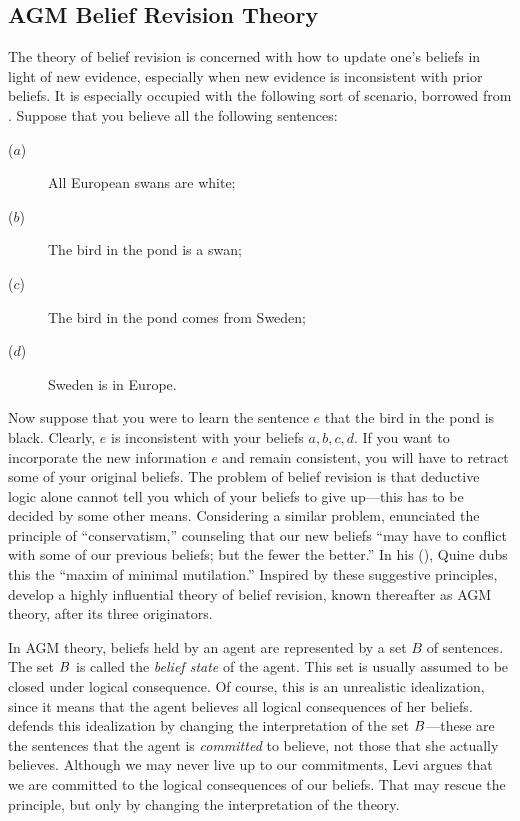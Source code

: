 \subsection{AGM Belief Revision Theory}
The theory of belief revision is concerned with how to update one's beliefs in
light of new evidence, especially when new evidence is inconsistent with prior
beliefs. It is especially occupied with the following sort of scenario, borrowed
from \citet{gardenfors1992beliefrevision}. Suppose that you believe all the
following sentences:
\begin{description}
\item[($a$)] All European swans are white;
\item[($b$)] The bird in the pond is a swan;
\item[($c$)] The bird in the pond comes from Sweden;
\item[($d$)] Sweden is in Europe. 
\end{description}
Now suppose that you were to learn the sentence $e$ that the bird in the pond is
black. Clearly, $e$ is inconsistent with your beliefs $a,b,c,d$. If you want to
incorporate the new information $e$ and remain consistent, you will have to
retract some of your original beliefs. The problem of belief revision is that
deductive logic alone cannot tell you which of your beliefs to give up---this
has to be decided by some other means. Considering a similar problem,
\citet*{quine1970web} enunciated the principle of ``conservatism,'' counseling
that our new beliefs ``may have to conflict with some of our previous beliefs;
but the fewer the better.'' In his (), Quine
dubs this the ``maxim of minimal mutilation.'' Inspired by these suggestive
principles, \citet*{alchourron1985logic} develop a highly influential theory of
belief revision, known thereafter as AGM theory, after its three originators.

In AGM theory, beliefs held by an agent are represented by a set $B$ of
sentences. The set $B$ is called the {\em belief state} of the agent. This
set is usually assumed to be closed under logical consequence. Of course, this
is an unrealistic idealization, since it means that the agent believes all
logical consequences of her beliefs. \citet{levi1991fixation} defends this
idealization by changing the interpretation of the set $B$---these are the
sentences that the agent is {\em committed} to believe, not those that she
actually believes. Although we may never live up to our commitments, Levi argues
that we are committed to the logical consequences of our beliefs. That may
rescue the principle, but only by changing the interpretation of the theory.

